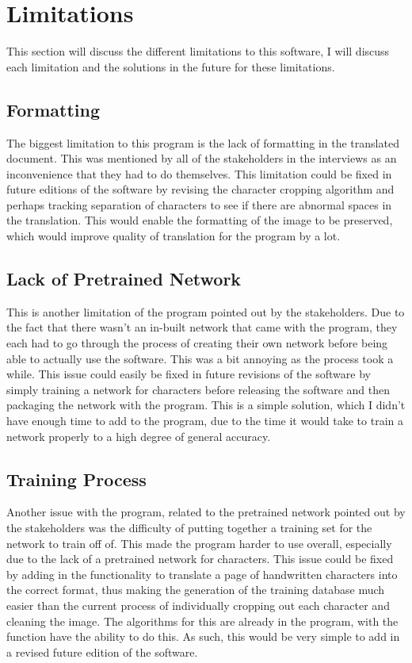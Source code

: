 \documentclass{report}
\begin{document}
\section{Limitations}
This section will discuss the different limitations to this software, I will discuss each limitation and the solutions in the future for these limitations.
\subsection{Formatting}
The biggest limitation to this program is the lack of formatting in the translated document. This was mentioned by all of the stakeholders in the interviews as an inconvenience that they had to do themselves.
\newline 
This limitation could be fixed in future editions of the software by revising the character cropping algorithm and perhaps tracking separation of characters to see if there are abnormal spaces in the translation. This would enable the formatting of the image to be preserved, which would improve quality of translation for the program by a lot.
\subsection{Lack of Pretrained Network}
This is another limitation of the program pointed out by the stakeholders. Due to the fact that there wasn't an in-built network that came with the program, they each had to go through the process of creating their own network before being able to actually use the software. This was a bit annoying as the process took a while. 
\newline
This issue could easily be fixed in future revisions of the software by simply training a network for characters before releasing the software and then packaging the network with the program. This is a simple solution, which I didn't have enough time to add to the program, due to the time it would take to train a network properly to a high degree of general accuracy.
\subsection{Training Process}
Another issue with the program, related to the pretrained network pointed out by the stakeholders was the difficulty of putting together a training set for the network to train off of. This made the program harder to use overall, especially due to the lack of a pretrained network for characters.
\newline
This issue could be fixed by adding in the functionality to translate a page of handwritten characters into the correct format, thus making the generation of the training database much easier than the current process of individually cropping out each character and cleaning the image. The algorithms for this are already in the program, with the  function have the ability to do this. As such, this would be very simple to add in a revised future edition of the software.
\end{document}
